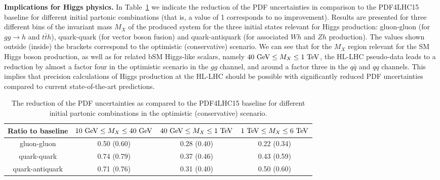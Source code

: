 {\bf Implications for Higgs physics.}
%
In Table~\ref{fig:PDFs-HL--LHC-summaryTable} we indicate
the reduction of the PDF uncertainties
in comparison to the PDF4LHC15 baseline for
different initial partonic combinations (that is, a value
of 1 corresponds to no improvement).
  Results are presented for three different bins
  of the invariant mass $M_X$ of the produced system for
  the three initial states relevant for Higgs production:
  gluon-gluon (for $gg\to h$ and $t\bar{t}h$), quark-quark
  (for vector boson fusion) and quark-antiquark
  (for associated $Wh$ and $Zh$ production).
  The values shown outside (inside) the brackets correspond to the
  optimistic (conservative) scenario.
  We can see that for the $M_X$ region relevant for the SM Higgs
  boson production, as well as for related bSM Higgs-like scalars, namely
  $40~{\rm GeV}\le M_X\le 1~{\rm TeV}$, the HL-LHC pseudo-data leads
  to a reduction by almost a factor four in the optimistic scenario
  in the $gg$ channel, and around a factor three in the $q\bar{q}$
  and $qq$ channels.
  This implies that precision calculations of Higgs production
  at the HL-LHC should be possible with significantly reduced PDF
  uncertainties compared to current state-of-the-art predictions.
  
\begin{table}[t]
  \begin{center}
  \small
   \renewcommand{\arraystretch}{1.70}
\begin{tabular}{c|c|c|c}
\toprule
Ratio to baseline  & $10~{\rm GeV}\le M_X\le 40~{\rm GeV}$   &
 $40~{\rm GeV}\le M_X\le 1~{\rm TeV}$&
  $1~{\rm TeV}\le M_X\le 6~{\rm TeV}$\\
\midrule
gluon-gluon & 0.50 (0.60)  & 0.28 (0.40)  & 0.22 (0.34)     \\
quark-quark &  0.74 (0.79) & 0.37 (0.46) &  0.43 (0.59)     \\
quark-antiquark & 0.71 (0.76) & 0.31 (0.40)  &  0.50 (0.60)     \\
\bottomrule
\end{tabular}
\vspace{+0.4cm}
\caption{\small The reduction of the PDF uncertainties
as compared to the PDF4LHC15 baseline for
different initial partonic combinations in the 
  optimistic (conservative) scenario.
     \label{fig:PDFs-HL--LHC-summaryTable}
 }
  \end{center}
\end{table}

